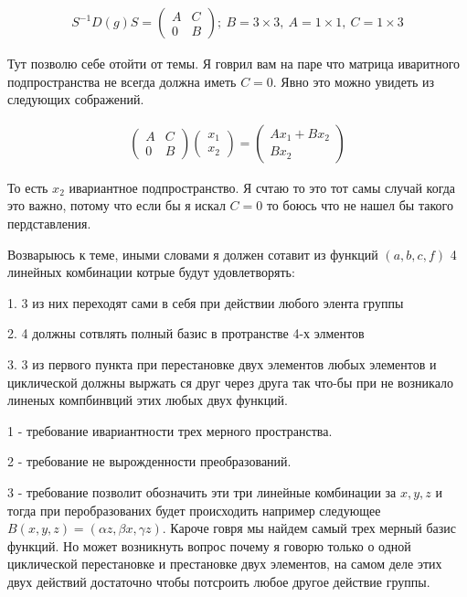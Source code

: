 \begin{gather}
    S^{-1} D(g) S =
    \begin{pmatrix}
        A& C\\
        0& B
    \end{pmatrix};
    \ B = 3\times 3, \  A = 1 \times 1, \ C = 1 \times 3
\end{gather}

Тут позволю себе отойти от темы. Я говрил вам на паре что матрица
иваритного подпространства не всегда должна иметь $C = 0$. Явно это можно увидеть 
из следующих сображений.

\begin{gather}
    \begin{pmatrix}
        A& C\\
        0& B
    \end{pmatrix}
    \begin{pmatrix}
        x_1\\ x_2
    \end{pmatrix}
    =
    \begin{pmatrix}
        A x_1 + B x_2\\ B x_2
    \end{pmatrix}
\end{gather}

То есть $x_2$ ивариантное подпространство. Я счтаю то это тот самы случай когда
это важно, потому что если бы я искал $C = 0$ то боюсь что не нашел бы такого пердставления.

Возварыюсь к теме, иными словами я должен сотавит из функций $(a, b, c, f)$ 4
линейных комбинации котрые будут удовлетворять:

1. 3 из них переходят сами в себя при действии любого элента группы

2. 4 должны сотвлять полный базис в протранстве 4-х элментов

3. 3 из первого пункта при перестановке двух элементов любых 
элементов и циклической должны выржать ся друг через друга так что-бы
при не возникало линеных компбинвций этих любых двух функций.

1 - требование ивариантности трех мерного пространства.

2 - требование не вырожденности преобразований.

3 - требование позволит обозначить эти три линейные комбинации за $x, y, z$
и тогда при перобразованих будет происходить например следующее $B (x, y, z) = (\alpha z, \beta x, \gamma z)$.
Кароче говря мы найдем самый трех мерный базис функций. Но может возникнуть вопрос почему я говорю
только о одной циклической перестановке и престановке двух элементов, на самом деле этих двух действий 
достаточно чтобы потсроить любое другое действие группы.

